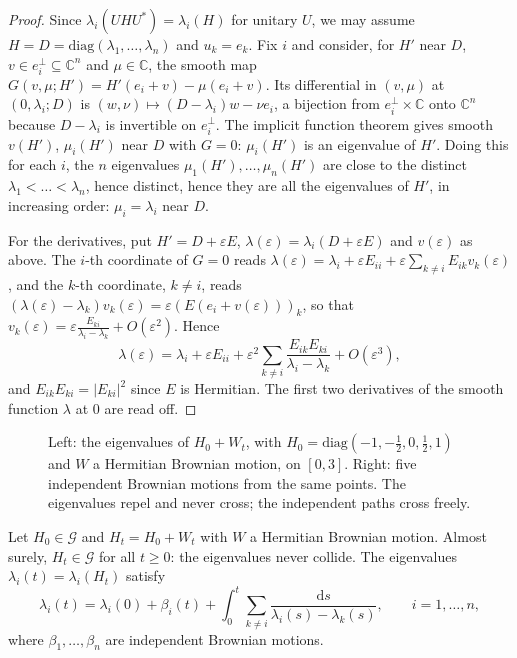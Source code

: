 \begin{proof}
Since $\lambda_i(UHU^*)=\lambda_i(H)$ for unitary $U$, we may assume $H=D=\mathrm{diag}(\lambda_1,\dots,\lambda_n)$ and $u_k=e_k$. Fix $i$ and consider, for $H'$ near $D$, $v\in e_i^\perp\subseteq\mathbb C^n$ and
$\mu\in\mathbb C$, the smooth map $G(v,\mu;H')=H'(e_i+v)-\mu(e_i+v)$. Its differential in $(v,\mu)$ at $(0,\lambda_i;D)$ is $(w,\nu)\mapsto(D-\lambda_i)w-\nu e_i$, a bijection from $e_i^\perp\times\mathbb C$ onto
$\mathbb C^n$ because $D-\lambda_i$ is invertible on $e_i^\perp$. The implicit function theorem gives smooth $v(H')$, $\mu_i(H')$ near $D$ with $G=0$: $\mu_i(H')$ is an eigenvalue of $H'$. Doing this for each $i$,
the $n$ eigenvalues $\mu_1(H'),\dots,\mu_n(H')$ are close to the distinct $\lambda_1<\dots<\lambda_n$, hence distinct, hence they are all the eigenvalues of $H'$, in increasing order: $\mu_i=\lambda_i$ near $D$.

For the derivatives, put $H'=D+\varepsilon E$, $\lambda(\varepsilon)=\lambda_i(D+\varepsilon E)$ and $v(\varepsilon)$ as above. The $i$-th coordinate of $G=0$ reads
$\lambda(\varepsilon)=\lambda_i+\varepsilon E_{ii}+\varepsilon\sum_{k\ne i}E_{ik}v_k(\varepsilon)$, and the $k$-th coordinate, $k\ne i$, reads $(\lambda(\varepsilon)-\lambda_k)v_k(\varepsilon)=\varepsilon(E(e_i+v(\varepsilon)))_k$, so that
$v_k(\varepsilon)=\varepsilon\frac{E_{ki}}{\lambda_i-\lambda_k}+O(\varepsilon^2)$. Hence
\[
\lambda(\varepsilon)=\lambda_i+\varepsilon E_{ii}+\varepsilon^2\sum_{k\ne i}\frac{E_{ik}E_{ki}}{\lambda_i-\lambda_k}+O(\varepsilon^3),
\]
and $E_{ik}E_{ki}=|E_{ki}|^2$ since $E$ is Hermitian. The first two derivatives of the smooth function $\lambda$ at $0$ are read off.
\end{proof}

\begin{figure}[ht]
\centering
{}
\caption{Left: the eigenvalues of $H_0+W_t$, with $H_0=\mathrm{diag}(-1,-\frac12,0,\frac12,1)$ and $W$ a Hermitian Brownian motion, on $[0,3]$. Right: five independent Brownian motions from the same points.
The eigenvalues repel and never cross; the independent paths cross freely.}
\label{fig:dyson}
\end{figure}

\begin{theorem}\label{thm:dyson}
Let $H_0\in\mathcal G$ and $H_t=H_0+W_t$ with $W$ a Hermitian Brownian motion. Almost surely, $H_t\in\mathcal G$ for all $t\ge0$: the eigenvalues never collide. The eigenvalues $\lambda_i(t)=\lambda_i(H_t)$ satisfy
\[
\lambda_i(t)=\lambda_i(0)+\beta_i(t)+\int_0^t\sum_{k\ne i}\frac{\mathrm ds}{\lambda_i(s)-\lambda_k(s)},\qquad i=1,\dots,n,
\]
where $\beta_1,\dots,\beta_n$ are independent Brownian motions.
\end{theorem}

